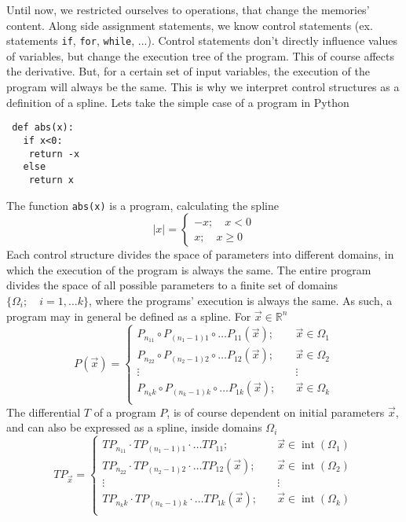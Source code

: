 \documentclass{article}
\newcommand{\RR}{\mathbb{R}}
\DeclareMathOperator{\interior}{int}
\begin{document}
 Until now, we restricted ourselves to operations, that change the memories' content. Along side assignment statements, we know control statements (ex. statements \texttt{if},
  \texttt{for}, \texttt{while}, ...). Control statements don't directly influence values of variables, but change the execution tree of the program. This of course affects the derivative. But, for a certain set of input variables, the execution of the program will always be the same. This is why we interpret control structures as a definition of a spline. Lets take the simple case of a program in Python
 \begin{verbatim}
 def abs(x):
   if x<0:
    return -x
   else
    return x
 \end{verbatim}
 The function \texttt{abs(x)} is a program, calculating the spline
 \begin{equation}
   \label{eq:zlepek}
   |x| =
   \begin{cases}
     -x;\quad x<0\\
     x;\quad x\ge 0
   \end{cases}
 \end{equation}
 Each control structure divides the space of parameters into different domains, in which the execution of the program is always the same. The entire program divides the space of all possible parameters to a finite set of domains $\{\Omega_i;\quad i=1,\ldots
  k\}$, where the programs' execution is always the same. As such, a program may in general be defined as a spline. For $\vec{x}\in\RR^n$
 \begin{equation}
   \label{eq:zlrprk_splosno}
   P(\vec{x}) =
   \begin{cases}
     P_{n_11}\circ P_{(n_1-1)1}\circ\ldots P_{11}(\vec{x});&\quad \vec{x}\in\Omega_1\\
     P_{n_22}\circ P_{(n_2-1)2}\circ\ldots P_{12}(\vec{x});&\quad \vec{x}\in\Omega_2\\
     \vdots&\quad\vdots\\
     P_{n_kk}\circ P_{(n_k-1)k}\circ\ldots P_{1k}(\vec{x});&\quad \vec{x}\in\Omega_k\\
   \end{cases}
 \end{equation}
 The differential $T$ of a program $P$, is of course dependent on initial parameters $\vec{x}$, and can also be expressed as a spline, inside domains $\Omega_i$
 \begin{equation}
   \label{eq:Dzlrprk_splosno}
   TP_{\vec{x}} =
   \begin{cases}
     TP_{n_11}\cdot TP_{(n_1-1)1}\cdot\ldots TP_{11};&\quad \vec{x}\in\interior(\Omega_1)\\
     TP_{n_22}\cdot TP_{(n_2-1)2}\cdot\ldots TP_{12}(\vec{x});&\quad \vec{x}\in\interior(\Omega_2)\\
     \vdots&\quad\vdots\\
     TP_{n_kk}\cdot TP_{(n_k-1)k}\cdot\ldots TP_{1k}(\vec{x});&\quad \vec{x}\in\interior(\Omega_k)\\
   \end{cases}
 \end{equation}
\end{document}
